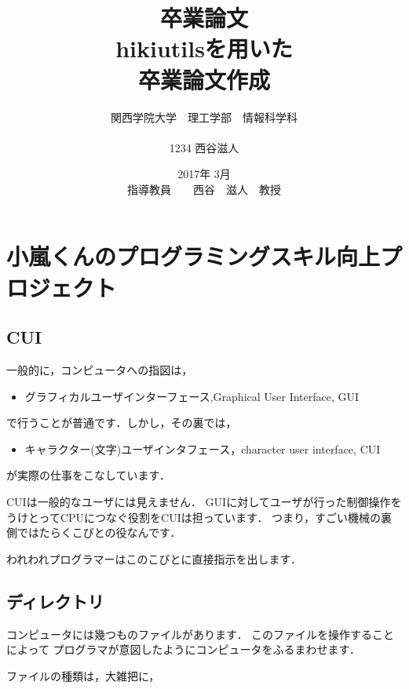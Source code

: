\documentclass[12pt,a4paper]{jsarticle}
\begin{document}
\title{卒業論文\\
\vspace{4cm} hikiutilsを用いた\\卒業論文作成}
\author{ 関西学院大学　理工学部　情報科学科\\\\1234 西谷滋人}
\date{\vspace{3cm} 2017年  3月\\
\vspace{3cm} 指導教員　　西谷　滋人　教授}
\maketitle
\setcounter{tocdepth}{6}
\tableofcontents

\tableofcontents
\section{小嵐くんのプログラミングスキル向上プロジェクト}
\subsection{CUI}
一般的に，コンピュータへの指図は，

\begin{itemize}
\item グラフィカルユーザインターフェース,Graphical User Interface, GUI
\end{itemize}
で行うことが普通です．しかし，その裏では，

\begin{itemize}
\item キャラクター(文字)ユーザインタフェース，character user interface, CUI
\end{itemize}
が実際の仕事をこなしています．

CUIは一般的なユーザには見えません．
GUIに対してユーザが行った制御操作を
うけとってCPUにつなぐ役割をCUIは担っています．
つまり，すごい機械の裏側ではたらくこびとの役なんです．

われわれプログラマーはこのこびとに直接指示を出します．

\subsection{ディレクトリ}
コンピュータには幾つものファイルがあります．
このファイルを操作することによって
プログラマが意図したようにコンピュータをふるまわせます．

ファイルの種類は，大雑把に，
\end{document}
